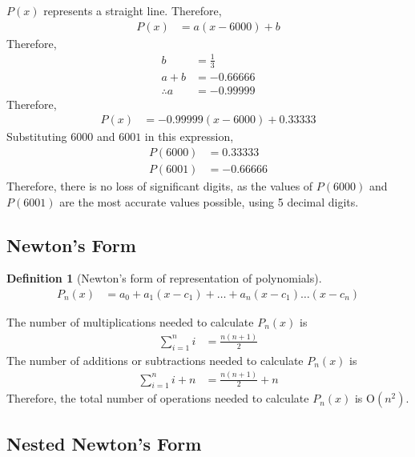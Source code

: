 \documentclass[fleqn, a4paper, 12pt, twoside]{article}
\theoremstyle{definition}
\newtheorem{definition}{Definition}
\theoremstyle{theorem}
\begin{document}
\begin{solution}
	$P(x)$ represents a straight line.
	Therefore,
	\begin{align*}
		P(x) &= a (x - 6000) + b
	\end{align*}
	Therefore,
	\begin{align*}
		b &= \frac{1}{3}\\
		a + b &= -0.66666\\
		\therefore a &= -0.99999
	\end{align*}
	Therefore,
	\begin{align*}
		P(x) &= -0.99999 (x - 6000) + 0.33333
	\end{align*}
	Substituting $6000$ and $6001$ in this expression,
	\begin{align*}
		P(6000) &= 0.33333\\
		P(6001) &= -0.66666
	\end{align*}
	Therefore, there is no loss of significant digits, as the values of $P(6000)$ and $P(6001)$ are the most accurate values possible, using 5 decimal digits.
\end{solution}

\subsection{Newton's Form}

\begin{definition}[Newton's form of representation of polynomials]
	\begin{align*}
		P_n(x) &= a_0 + a_1 (x - c_1) + \dots + a_n (x - c_1) \dots (x - c_n)
	\end{align*}
\end{definition}

The number of multiplications needed to calculate $P_n(x)$ is 
\begin{align*}
	\sum\limits_{i = 1}^{n} i &= \frac{n (n + 1)}{2}
\end{align*}
The number of additions or subtractions needed to calculate $P_n(x)$ is 
\begin{align*}
	\sum\limits_{i = 1}^{n} i + n &= \frac{n (n + 1)}{2} + n
\end{align*}
Therefore, the total number of operations needed to calculate $P_n(x)$ is $\mathrm{O}(n^2)$.

\subsection{Nested Newton's Form}
\end{document}
